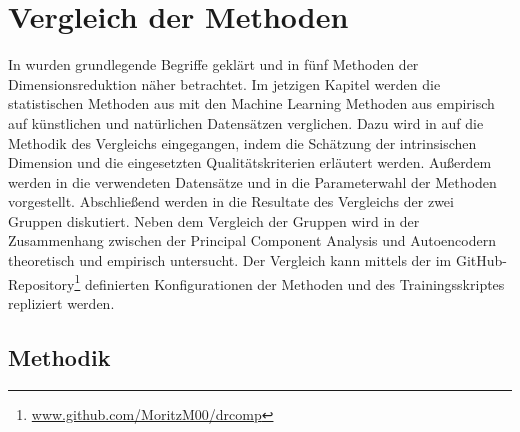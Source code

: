 \chapter{Vergleich der Methoden}
\label{ch:Vergleich}

In  wurden grundlegende Begriffe geklärt und in
 fünf Methoden der Dimensionsreduktion näher betrachtet. Im jetzigen
Kapitel werden die statistischen Methoden aus  mit den
Machine Learning Methoden aus  empirisch auf künstlichen und
natürlichen Datensätzen verglichen. Dazu wird in  auf die
Methodik des Vergleichs eingegangen, indem die Schätzung der intrinsischen Dimension und die
eingesetzten Qualitätskriterien erläutert werden. Außerdem werden in
 die verwendeten Datensätze und in
 die Parameterwahl der Methoden vorgestellt.
Abschließend werden in  die Resultate des Vergleichs der zwei
Gruppen diskutiert. Neben dem Vergleich der Gruppen wird in
 der Zusammenhang zwischen der Principal Component
Analysis und Autoencodern theoretisch und empirisch untersucht. Der Vergleich kann mittels der im
GitHub-Repository\footnote{\url{www.github.com/MoritzM00/drcomp}} definierten Konfigurationen der
Methoden und des Trainingsskriptes repliziert werden.

\section{Methodik}
\label{ch:Vergleich:sec:Methodik}

